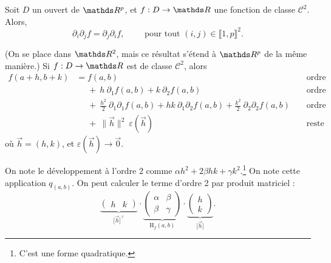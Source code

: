 \begin{prop}
	Soit $D$ un ouvert de $\R^p$, et $f : D \to \R$ une fonction de classe $\mathcal{C}^2$. Alors, \[
		\partial_i \partial_j f = \partial_j \partial_i f, \quad\quad \text{ pour tout } (i,j) \in \llbracket 1,p \rrbracket^2
	.\]
\end{prop}

\begin{thm}
	(On se place dans $\R^2$, mais ce résultat s'étend à $\R^p$ de la même manière.)
	Si $f : D \to \R$ est de classe $\mathcal{C}^2$, alors
	\begin{align*}
		f(a+h,b+k) &= f(a,b) && \text{ ordre 0}\\
							 &\mathrel{\phantom=}+\: h\:\partial_1 f(a,b) + k\:\partial_2 f(a,b) && \text{ ordre 1}\\
							 &\mathrel{\phantom=}+\: \frac{h^2}{2}\: \partial_1 \partial_1 f(a,b) + hk\:\partial_1 \partial_2 f(a,b) + \frac{k^2}{2}\:\partial_2 \partial_2 f(a,b) && \text{ ordre 2}\\
							 &\mathrel{\phantom=}+\: \|\vec{h}\|^2 \:\varepsilon(\vec{h}) && \text{ reste}
	\end{align*}
	où $\vec{h} = (h,k)$, et $\varepsilon(\vec{h}) \to \vec{0}$.
\end{thm}

On note le développement à l'ordre 2 comme $\alpha h^2 + 2 \beta hk + \gamma k^2$.\footnote{C'est une forme quadratique.} On note cette application $q_{(a,b)}$.
On peut calculer le terme d'ordre 2 par produit matriciel : \[
	\underbrace{\begin{pmatrix}
		h & k
	\end{pmatrix}}_{\big[\vec{h}\big]^\top} \cdot
	\underbrace{\begin{pmatrix}
		\alpha & \beta\\
		\beta & \gamma
	\end{pmatrix}}_{\mathrm{H}_f(a,b)} \cdot 
	\underbrace{\begin{pmatrix}
		h \\ k
	\end{pmatrix}}_{\big[\vec{h}\big]}
.\]

